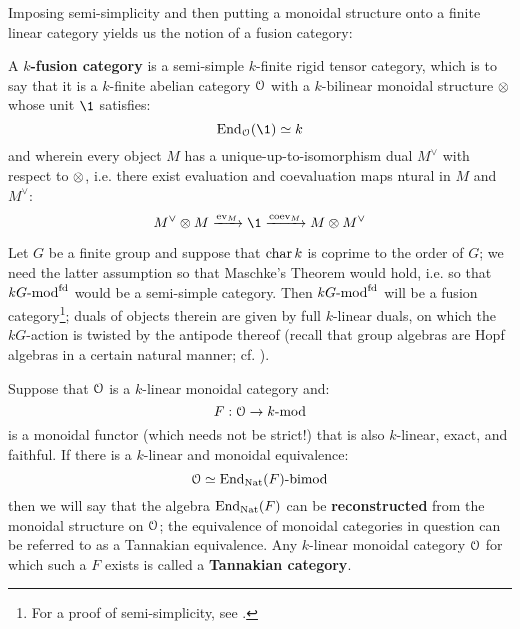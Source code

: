             Imposing semi-simplicity and then putting a monoidal structure onto a finite linear category yields us the notion of a fusion category:
            \begin{definition} \label{def: fusion_categories}
                A \textbf{$k$-fusion category} is a semi-simple $k$-finite rigid tensor category, which is to say that it is a $k$-finite abelian category $\mathcal{O}$ with a $k$-bilinear monoidal structure $\tensor$ whose unit $\1$ satisfies:
                    $$\End_{\calO}(\1) \cong k$$
                and wherein every object $M$ has a unique-up-to-isomorphism dual $M^{\vee}$ with respect to $\tensor$, i.e. there exist evaluation and coevaluation maps ntural in $M$ and $M^{\vee}$:
                    $$M^{\vee} \tensor M \xrightarrow[]{\ev_M} \1 \xrightarrow[]{\co\ev_M} M \tensor M^{\vee}$$
            \end{definition}
            \begin{example}
                Let $G$ be a finite group and suppose that $\operatorname{char} k$ is coprime to the order of $G$; we need the latter assumption so that Maschke's Theorem would hold, i.e. so that $kG\text{-}\mathrm{mod}^{\mathrm{fd}}$ would be a semi-simple category. Then $kG\text{-}\mathrm{mod}^{\mathrm{fd}}$ will be a fusion category\footnote{For a proof of semi-simplicity, see \cite{lam_first_course_in_noncommutative_rings}.}; duals of objects therein are given by full $k$-linear duals, on which the $kG$-action is twisted by the antipode thereof (recall that group algebras are Hopf algebras in a certain natural manner; cf. \cite[Chapter III]{kassel_quantum_groups}). 
            \end{example}
            \begin{definition}
                Suppose that $\mathcal{O}$ is a $k$-linear monoidal category and:
                    $$F: \mathcal{O} \to k\text{-}\mathrm{mod}$$
                is a monoidal functor (which needs not be strict!) that is also $k$-linear, exact, and faithful. If there is a $k$-linear and monoidal equivalence:
                    $$\mathcal{O} \simeq \mathrm{End}_{\mathrm{Nat}}(F)\text{-}\mathrm{bimod}$$
                then we will say that the algebra $\mathrm{End}_{\mathrm{Nat}}(F)$ can be \textbf{reconstructed} from the monoidal structure on $\mathcal{O}$; the equivalence of monoidal categories in question can be referred to as a Tannakian equivalence. Any $k$-linear monoidal category $\mathcal{O}$ for which such a  $F$ exists is called a \textbf{Tannakian category}.
            \end{definition}
